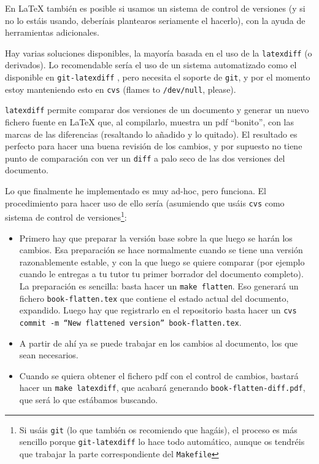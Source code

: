 En \LaTeX{} también es posible si usamos un sistema de control de
versiones (y si no lo estáis usando, deberíais plantearos seriamente el
hacerlo), con la ayuda de herramientas adicionales.

Hay varias soluciones disponibles, la mayoría basada en el uso de la
\texttt{latexdiff} \cite{latexdiff} (o derivados). Lo recomendable sería
el uso de un sistema automatizado como el disponible en
\texttt{git-latexdiff} \cite{git-latexdiff}, pero necesita el soporte de
\texttt{git}, y por el momento estoy manteniendo esto en \texttt{cvs}
(flames to \texttt{/dev/null}, please).

\texttt{latexdiff} permite comparar dos versiones de un documento y
generar un nuevo fichero fuente en \LaTeX{} que, al compilarlo, muestra un
pdf ``bonito'', con las marcas de las diferencias (resaltando lo añadido
y lo quitado). El resultado es perfecto para hacer una buena revisión de
los cambios, y por supuesto no tiene punto de comparación con ver un
\texttt{diff} a palo seco de las dos versiones del documento. 

Lo que finalmente he implementado es muy ad-hoc, pero funciona. El
procedimiento para hacer uso de ello sería (asumiendo que usáis
\texttt{cvs} como sistema de control de versiones\footnote{Si usáis
  \texttt{git} (lo que también os recomiendo que hagáis), el proceso es
  más sencillo porque \texttt{git-latexdiff} lo hace todo automático,
  aunque os tendréis que trabajar la parte correspondiente del
  \texttt{Makefile}}:

\begin{itemize}
\item Primero hay que preparar la versión base sobre la que luego se
  harán los cambios. Esa preparación se hace normalmente cuando se tiene
  una versión razonablemente estable, y con la que luego se quiere
  comparar (por ejemplo cuando le entregas a tu tutor tu primer borrador
  del documento completo). La preparación es sencilla: basta hacer un
  \texttt{make flatten}. Eso generará un fichero
  \texttt{book-flatten.tex} que contiene el estado actual del documento,
  expandido. Luego hay que registrarlo en el repositorio basta hacer un
  \texttt{cvs commit -m ``New flattened version'' book-flatten.tex}.
\item A partir de ahí ya se puede trabajar en los cambios al documento,
  los que sean necesarios.
\item Cuando se quiera obtener el fichero pdf con el control de cambios,
  bastará hacer un \texttt{make latexdiff}, que acabará generando
  \texttt{book-flatten-diff.pdf}, que será lo que estábamos buscando.
\end{itemize}



